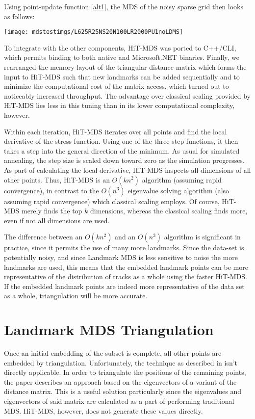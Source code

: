 \documentclass[10pt,fleqn,a4paper]{article}
\begin{document}
\begin{twocolumn}
Using point-update function \ref{alt1}, the MDS of the noisy sparse grid then looks as follows:\\
\vspace{-7mm}
\begin{center}\texttt{[image: mdstestimgs/L625R25NS20N100LR2000PU1noLDMS]}\end{center}
\vspace{-4mm}

To integrate with the other components, HiT-MDS was ported to C++/CLI, which permits binding to both native and Microsoft.NET binaries.  Finally, we rearranged the memory layout of the triangular distance matrix which forms the input to HiT-MDS such that new landmarks can be added sequentially and to minimize the computational cost of the matrix access, which turned out to noticeably increased throughput.  The advantage over classical scaling provided by HiT-MDS lies less in this tuning than in its lower computational complexity, however.

Within each iteration, HiT-MDS iterates over all points and find the local derivative of the stress function.  Using one of the three step functions, it then takes a step into the general direction of the minimum.  As usual for simulated annealing, the step size is scaled down toward zero as the simulation progresses.  As part of calculating the local derivative, HiT-MDS inspects all dimensions of all other points.  Thus, HiT-MDS is an $O(k n^2)$ algorithm (assuming rapid convergence), in contrast to the $O(n^3)$ eigenvalue solving algorithm (also assuming rapid convergence) which classical scaling employs.  Of course, HiT-MDS merely finds the top $k$ dimensions, whereas the classical scaling finds more, even if not all dimensions are used.  

The difference between an $O(k n^2)$ and an $O(n^3)$ algorithm is significant in practice, since it permits the use of many more landmarks.  Since the data-set is potentially noisy, and since Landmark MDS is less sensitive to noise the more landmarks are used, this means that the embedded landmark points can be more representative of the distribution of tracks as a whole using the faster HiT-MDS.  If the embedded landmark points are indeed more representative of the data set as a whole, triangulation will be more accurate.

\section{Landmark MDS Triangulation}
Once an initial embedding of the subset is complete, all other points are embedded by triangulation.  Unfortunately, the technique as described in \cite{desilva:sms} isn't directly applicable.  In order to triangulate the positions of the remaining points, the paper describes an approach based on the eigenvectors of a variant of the distance matrix.  This is a useful solution particularly since the eigenvalues and eigenvectors of said matrix are calculated as a part of performing traditional MDS. HiT-MDS, however, does not generate these values directly.


\end{twocolumn}
\end{document}

